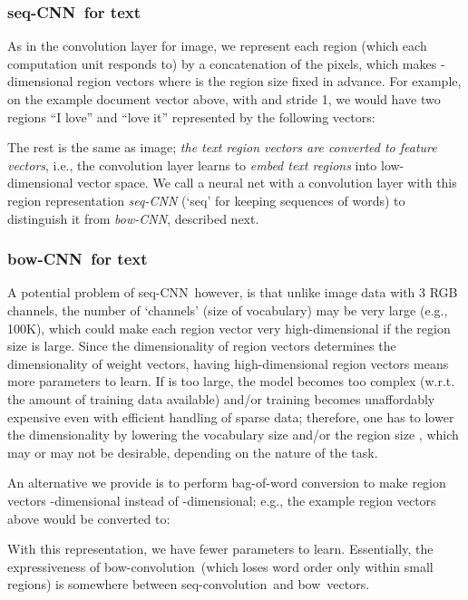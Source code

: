 \documentclass[11pt,letterpaper]{article}
\newcommand{\scnn}{seq-CNN}
\newcommand{\sconv}{seq-convolution}
\newcommand{\bcnn}{bow-CNN}
\newcommand{\bconv}{bow-convolution}
\newcommand{\bow}{{bow}}
\begin{document}
\subsubsection{\scnn\ for text}
\label{sec:scnn}

As in the convolution layer for image, we 
represent each region (which each computation unit responds to) 
by a concatenation of the pixels, 
which makes -dimensional region vectors where  is the region size 
fixed in advance.  
For example, on the example document vector  above, with  and stride 1, 
we would have two regions 
``I love'' and ``love it'' represented by the following vectors: 

The rest is the same as image; 
{\em the text region vectors are converted to feature vectors}, 
i.e., 
the convolution layer learns to {\em embed text regions} into low-dimensional vector space.   
We call a neural net with a convolution layer with this region representation 
{\em \scnn} (`seq' for keeping sequences of words) 
to distinguish it from {\em \bcnn}, described next.  

\subsubsection{\bcnn\ for text} 
\label{sec:bowconv}

A potential problem of \scnn\, 
however, is that unlike image data with 3 RGB channels, 
the number of `channels'  (size of vocabulary) may be very 
large (e.g., 100K), which could make each region vector  very high-dimensional 
if the region size  is large.  
Since the dimensionality of region vectors determines the dimensionality of weight vectors, 
having high-dimensional region vectors means more parameters to learn.  If  is too large, 
the model becomes too complex (w.r.t. the amount of training data available) and/or training 
becomes unaffordably expensive even with efficient handling of sparse data; 
therefore, one has to lower the dimensionality by lowering 
the vocabulary size  and/or the region size , which may or may not be desirable, 
depending on the nature of the task.  

An alternative we provide is to perform bag-of-word conversion to make region vectors 
-dimensional instead of -dimensional; 
e.g., the example region vectors above would be converted to: 
\vspace{-0.25in}

With this representation, we have fewer parameters to learn.  
Essentially, the expressiveness of \bconv\ (which loses word order only within small regions) 
is somewhere between 
\sconv\ and \bow\ vectors. 
\end{document}
